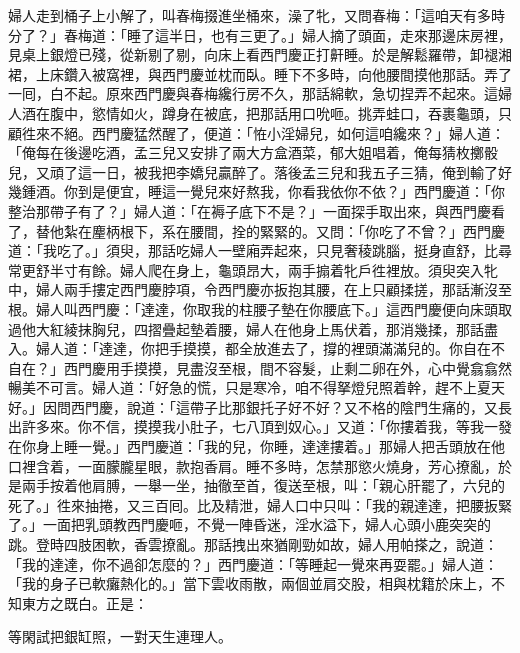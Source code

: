 婦人走到桶子上小解了，叫春梅掇進坐桶來，澡了牝，又問春梅：「這咱天有多時分了？」春梅道：「睡了這半日，也有三更了。」婦人摘了頭面，走來那邊床房裡，見桌上銀燈已殘，從新剔了剔，向床上看西門慶正打鼾睡。於是解鬆羅帶，卸褪湘裙，上床鑽入被窩裡，與西門慶並枕而臥。睡下不多時，向他腰間摸他那話。弄了一囘，白不起。原來西門慶與春梅纔行房不久，那話綿軟，急切捏弄不起來。這婦人酒在腹中，慾情如火，蹲身在被底，把那話用口吮咂。挑弄蛙口，吞裹龜頭，只顧徃來不絕。西門慶猛然醒了，便道：「恠小淫婦兒，如何這咱纔來？」婦人道：「俺每在後邊吃酒，孟三兒又安排了兩大方盒酒菜，郁大姐唱着，俺每猜枚擲骰兒，又頑了這一日，被我把李嬌兒贏醉了。落後孟三兒和我五子三猜，俺到輸了好幾鍾酒。你到是便宜，睡這一覺兒來好熬我，你看我依你不依？」{}西門慶道：「你整治那帶子有了？」婦人道：「在褥子底下不是？」一面探手取出來，與西門慶看了，替他紮在麈柄根下，系在腰間，拴的緊緊的。又問：「你吃了不曾？」西門慶道：「我吃了。」須臾，那話吃婦人一壁廂弄起來，{}只見奢稜跳腦，挺身直舒，比尋常更舒半寸有餘。婦人爬在身上，龜頭昂大，兩手搧着牝戶徃裡放。須臾突入牝中，婦人兩手摟定西門慶脖項，令西門慶亦扳抱其腰，在上只顧揉搓，那話漸沒至根。婦人叫西門慶：「達達，你取我的柱腰子墊在你腰底下。」這西門慶便向床頭取過他大紅綾抹胸兒，四摺疊起墊着腰，婦人在他身上馬伏着，那消幾揉，那話盡入。婦人道：「達達，你把手摸摸，都全放進去了，撐的裡頭滿滿兒的。你自在不自在？」西門慶用手摸摸，見盡沒至根，間不容髮，止剩二卵在外，心中覺翕翕然暢美不可言。婦人道：「好急的慌，只是寒冷，咱不得拏燈兒照着幹，趕不上夏天好。」因問西門慶，說道：「這帶子比那銀托子好不好？又不格的陰門生痛的，又長出許多來。你不信，摸摸我小肚子，七八頂到奴心。」又道：「你摟着我，等我一發在你身上睡一覺。」西門慶道：「我的兒，你睡，達達摟着。」那婦人把舌頭放在他口裡含着，一面朦朧星眼，款抱香肩。睡不多時，怎禁那慾火燒身，芳心撩亂，於是兩手按着他肩膊，一舉一坐，抽徹至首，復送至根，叫：「親心肝罷了，六兒的死了。」徃來抽捲，又三百囘。比及精泄，婦人口中只叫：「我的親達達，把腰扳緊了。」一面把乳頭教西門慶咂，不覺一陣昏迷，淫水溢下，婦人心頭小鹿突突的跳。登時四肢困軟，香雲撩亂。那話拽出來猶剛勁如故，婦人用帕搽之，說道：「我的達達，你不過卻怎麼的？」西門慶道：「等睡起一覺來再耍罷。」婦人道：「我的身子已軟癱熱化的。」{}當下雲收雨散，兩個並肩交股，相與枕籍於床上，不知東方之既白。正是：

\begin{myquote}
等閑試把銀缸照，一對天生連理人。
\end{myquote}


